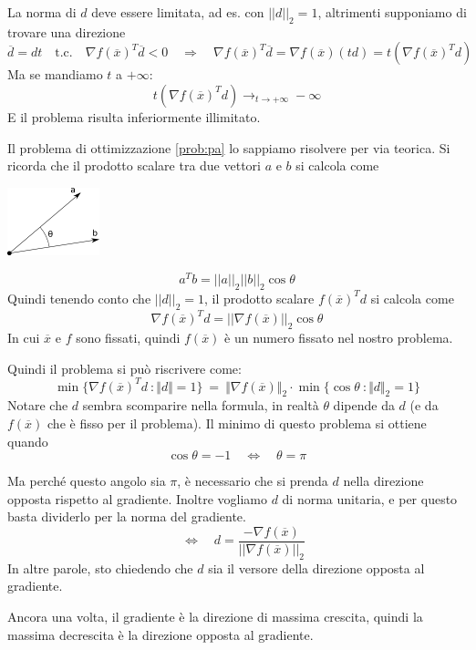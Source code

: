 \begin{notes} La norma di $d$ deve essere limitata, ad es. con
$||d||_2 = 1$, altrimenti supponiamo di trovare una direzione
$$ \overline{d} = dt \quad \text{t.c.} \quad \nabla f(\overline{x})^{T} \overline{d} < 0 \quad \Longrightarrow \quad\nabla f(\overline{x})^{T} \overline{d} = \nabla f(\overline{x})(td) = t(\nabla f(\overline{x})^{T}d)$$
Ma se mandiamo $t$ a $+\infty$:
$$t(\nabla f(\overline{x})^{T}d) \longrightarrow_{t \to +\infty} - \infty$$
E il problema risulta inferiormente illimitato.
\end{notes}

Il problema di ottimizzazione \ref{prob:pa} lo sappiamo risolvere per
via teorica. Si ricorda che il prodotto scalare tra due vettori $a$ e
$b$ si calcola come

\centerline{\includegraphics[width=0.20\textwidth]{imgs/a-b-theta.png}}

$$a^{T}b = ||a||_{2} ||b||_2 \cos \theta$$
Quindi tenendo conto che $||d||_2 = 1$, il prodotto scalare
$f(\overline{x})^{T}d$ si calcola come
$$\nabla f(\overline{x})^{T} d =  || \nabla f(\overline{x})||_{2} \cos \theta$$
In cui $\overline{x}$ e $f$ sono fissati, quindi $f(\overline{x})$ \`e
un numero fissato nel nostro problema.

Quindi il problema si può riscrivere come:
$$ \min \{ \nabla f(\overline{x})^{T}d ~ : \Vert d \Vert = 1 \} ~ =  ~ \Vert\nabla f(\overline{x})\Vert_{2} \cdot \min\{ \cos \theta ~ : \Vert d \Vert_{2}=1 \}$$
Notare che $d$ sembra scomparire nella formula, in realt\`a $\theta$
dipende da $d$ (e da $f(\overline{x})$ che \`e fisso per il problema).
Il minimo di questo problema si ottiene quando
$$ \cos \theta = -1 \quad \Longleftrightarrow \quad  \theta = \pi $$

Ma perch\'e questo angolo sia $\pi$, \`e necessario che si prenda $d$
nella direzione opposta rispetto al gradiente. Inoltre vogliamo $d$ di
norma unitaria, e per questo basta dividerlo per la norma del
gradiente.
$$\quad \Longleftrightarrow \quad d = \frac{- \nabla f(\overline{x})}{|| \nabla f(\overline{x})||_{2}}$$
In altre parole, sto chiedendo che $d$ sia il versore della direzione
opposta al gradiente.

Ancora una volta, il gradiente \`e la direzione di massima crescita,
quindi la massima decrescita \`e la direzione opposta al gradiente.

